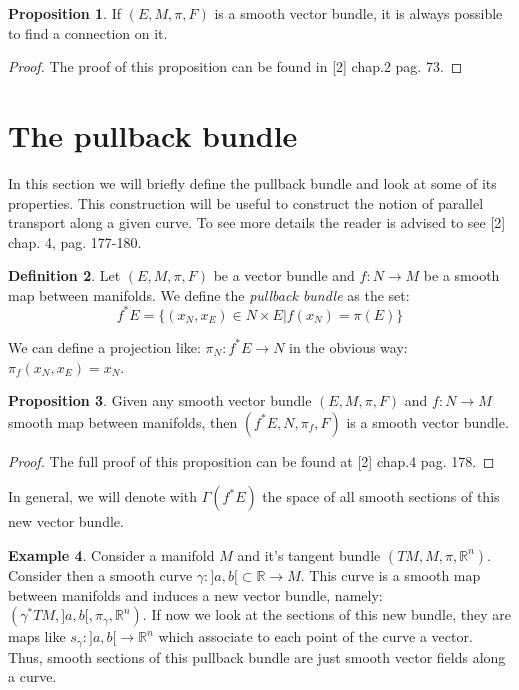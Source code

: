 \documentclass[12pt,a4paper]{report}
\theoremstyle{definition}
\newtheorem{Def}{Definition}[chapter]
\theoremstyle{Theorem}
\newtheorem{Prop}[Def]{Proposition}
\theoremstyle{definition}
\newtheorem{Ex}[Def]{Example}
\theoremstyle{definition}
\begin{document}
	\begin{Prop}
		If $(E,M,\pi,F)$ is a smooth vector bundle, it is always possible to find a connection on it.
	\end{Prop}
	\begin{proof}
		The proof of this proposition can be found in [2] chap.2 pag. 73.
	\end{proof}
	\section{The pullback bundle}
	In this section we will briefly define the pullback bundle and look at some of its properties. This construction will be useful to construct the notion of parallel transport along a given curve. To see more details the reader is advised to see [2] chap. 4, pag. 177-180.
	\begin{Def}
		Let $(E,M,\pi,F)$ be a vector bundle and $f:N\rightarrow M$ be a smooth map between manifolds. We define the \textit{pullback bundle} as the set:
		$$f^*E=\{(x_N,x_E)\in N\times E|f(x_N)=\pi(E)\}$$
	\end{Def}
	We can define a projection like: $\pi_N:f^*E\rightarrow N$ in the obvious way: $\pi_f(x_N,x_E)=x_N$. 
	\begin{Prop}
		Given any smooth vector bundle $(E,M,\pi,F)$ and $f:N\rightarrow M$ smooth map between manifolds, then $(f^*E,N,\pi_f,F)$ is a smooth vector bundle.
	\end{Prop}
	\begin{proof}
		The full proof of this proposition can be found at [2] chap.4 pag. 178.
	\end{proof}
	In general, we will denote with $\Gamma(f^*E)$ the space of all smooth sections of this new vector bundle.
	\begin{Ex}
		Consider a manifold $M$ and it's tangent bundle $(TM,M,\pi,\mathbb{R}^n)$. Consider then a smooth curve $\gamma:]a,b[\subset \mathbb{R}\rightarrow M$. This curve is a smooth map between manifolds and induces a new vector bundle, namely: $(\gamma^*TM,]a,b[,\pi_\gamma,\mathbb{R}^n)$. If now we look at the sections of this new bundle, they are maps like $s_\gamma:]a,b[\rightarrow\mathbb{R}^n$ which associate to each point of the curve a vector. Thus, smooth sections of this pullback bundle are just smooth vector fields along a curve.
	\end{Ex}
\end{document}
